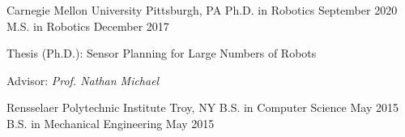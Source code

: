 
\begin{cventries}
  \cventrytwo
  {Carnegie Mellon University}
  {Pittsburgh, PA}
  {Ph.D. in Robotics}
  {September 2020}
  {}
  {M.S. in Robotics}
  {December 2017}
  {
    \begin{cvitems} %
    \item {Thesis (Ph.D.): Sensor Planning for Large Numbers of Robots}
    \item {Advisor: \emph{Prof. Nathan Michael}}
    \end{cvitems}
  }

  \cventrytwo
  {Rensselaer Polytechnic Institute} %
  {Troy, NY} %
  {B.S. in Computer Science} %
  {May 2015} %
  {}
  {B.S. in Mechanical Engineering} %
  {May 2015} %
  {}
\end{cventries}

